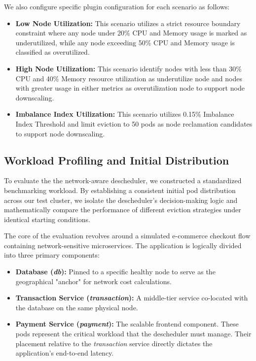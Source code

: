 We also configure specific plugin configuration for each scenario as follows:

\begin{itemize}
    \item \textbf{Low Node Utilization:} This scenario utilizes a strict resource boundary constraint where any node under 20\% CPU and Memory usage is marked as underutilized, while any node exceeding 50\% CPU and Memory usage is classified as overutilized.

    \item \textbf{High Node Utilization:} This scenario identify nodes with less than 30\% CPU and 40\% Memory resource utilization as underutilize node and nodes with greater usage in either metrics as overutilization node to support node downscaling.

    \item \textbf{Imbalance Index Utilization:} This scenario utilizes 0.15\% Imbalance Index Threshold and limit eviction to 50 pods as node reclamation candidates to support node downscaling.
\end{itemize}

\subsection{Workload Profiling and Initial Distribution}
\label{subsec:netaware4_workloadprofiling}

To evaluate the the network-aware descheduler, we constructed a standardized benchmarking workload. By establishing a consistent initial pod distribution across our test cluster, we isolate the descheduler's decision-making logic and mathematically compare the performance of different eviction strategies under identical starting conditions.

The core of the evaluation revolves around a simulated e-commerce checkout flow containing network-sensitive microservices. The application is logically divided into three primary components:

\begin{itemize}
    \item \textbf{Database (\textit{db}):} Pinned to a specific healthy node to serve as the geographical "anchor" for network cost calculations.
    \item \textbf{Transaction Service (\textit{transaction}):} A middle-tier service co-located with the database on the same physical node.
    \item \textbf{Payment Service (\textit{payment}):} The scalable frontend component. These pods represent the critical workload that the descheduler must manage. Their placement relative to the \textit{transaction} service directly dictates the application's end-to-end latency.
\end{itemize}

